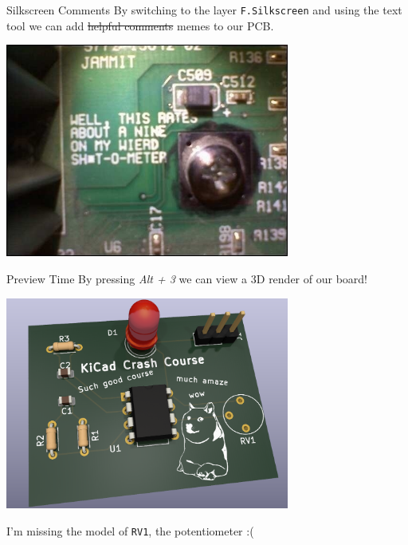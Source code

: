 \documentclass{beamer}
\begin{document}
\begin{frame}{Silkscreen Comments}
  By switching to the layer \texttt{F.Silkscreen} and using the text tool we can add \sout{helpful comments} memes to our PCB.
  \begin{center}
    \includegraphics[width=0.7\textwidth]{images/pcb-memes.png}
  \end{center}
\end{frame}

\begin{frame}{Preview Time}
  By pressing \textit{Alt + 3} we can view a 3D render of our board!\\
  \begin{center}
    \includegraphics[width=0.7\textwidth]{images/3d-preview.png}
  \end{center}
  \pause
  I'm missing the model of \texttt{RV1}, the potentiometer :(
\end{frame}
\end{document}
